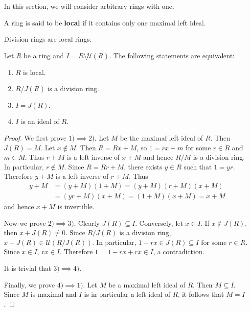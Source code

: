 \chapter{}
\label{09}


In this section, we will consider arbitrary rings with one. 

\begin{definition}
    A ring is said to be \textbf{local} if it contains only one maximal left ideal. 
\end{definition}

Division rings are local rings. 


\begin{theorem}
\label{thm:local}
    Let $R$ be a ring and $I=R\setminus\mathcal{U}(R)$. The following
    statements are equivalent:
    \begin{enumerate}
        \item $R$ is local.
        \item $R/J(R)$ is a division ring.
        \item $I=J(R)$.
        \item $I$ is an ideal of $R$.
    \end{enumerate}
\end{theorem}

\begin{proof}
    We first prove $1)\implies2)$. Let $M$ be the maximal left ideal of $R$. Then $J(R)=M$. 
    Let $x\not\in M$. Then $R=Rx+M$, so $1=rx+m$ for some $r\in R$ and $m\in M$. Thus  
    $r+M$ is a left inverse of $x+M$ and hence $R/M$ is a division ring. In particular, 
    $r\not\in M$. Since $R=Rr+M$, there exists $y\in R$ such that $1=yr$. Therefore
    $y+M$ is a left inverse of $r+M$. Thus 
    \begin{align*}
    y+M&=(y+M)(1+M)=(y+M)(r+M)(x+M)\\
    &=(yr+M)(x+M)=(1+M)(x+M)=x+M
    \end{align*}
    and hence $x+M$ is invertible. 

    Now we prove $2)\implies3)$. Clearly $J(R)\subseteq I$. 
    Conversely, let $x\in I$. If $x\not\in J(R)$, then
    $x+J(R)\ne 0$. Since $R/J(R)$ is a division ring, 
    $x+J(R)\in\mathcal{U}(R/J(R))$. In particular,  
    $1-rx\in J(R)\subseteq I$ for some $r\in R$. Since $x\in I$, 
    $rx\in I$. Therefore $1=1-rx+rx\in I$, a contradiction. 
    
    It is trivial that $3)\implies4)$. 

    Finally, we prove $4)\implies 1)$. 
    Let $M$ be a maximal left ideal of $R$. Then $M\subseteq I$. Since $M$ 
    is maximal and $I$ is in particular a left ideal of $R$, 
    it follows that $M=I$. 
\end{proof}

